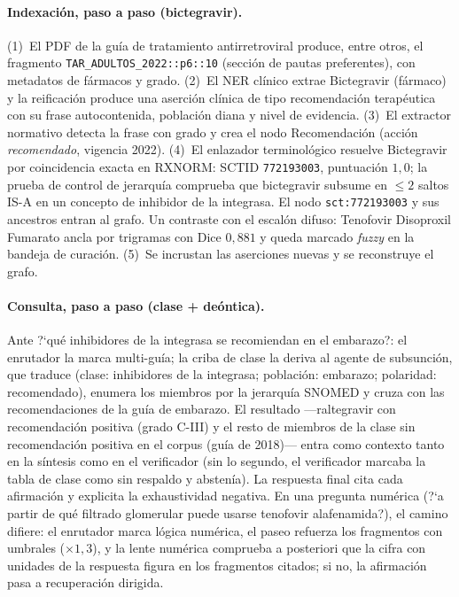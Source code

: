 \documentclass[11pt,a4paper]{article}
\begin{document}
\paragraph{Indexación, paso a paso (bictegravir).}
(1)~El PDF de la guía de tratamiento antirretroviral produce, entre otros,
el fragmento \texttt{TAR\_ADULTOS\_2022::p6::10} (sección de pautas
preferentes), con metadatos de fármacos y grado.
(2)~El NER clínico extrae \guillemotleft{}Bictegravir\guillemotright{} (fármaco) y la reificación
produce una aserción clínica de tipo recomendación terapéutica con su
frase autocontenida, población diana y nivel de evidencia.
(3)~El extractor normativo detecta la frase con grado y crea el nodo
Recomendación (acción \emph{recomendado}, vigencia 2022).
(4)~El enlazador terminológico resuelve \guillemotleft{}Bictegravir\guillemotright{} por coincidencia
exacta en RXNORM: SCTID \texttt{772193003}, puntuación $1{,}0$; la prueba
de control de jerarquía comprueba que bictegravir subsume en $\le 2$ saltos
IS-A en un concepto de \guillemotleft{}inhibidor de la integrasa\guillemotright{}. El nodo
\texttt{sct:772193003} y sus ancestros entran al grafo. Un contraste con el
escalón difuso: \guillemotleft{}Tenofovir Disoproxil Fumarato\guillemotright{} ancla por trigramas con
Dice $0{,}881$ y queda marcado \emph{fuzzy} en la bandeja de curación.
(5)~Se incrustan las aserciones nuevas y se reconstruye el grafo.

\paragraph{Consulta, paso a paso (clase + deóntica).}
Ante \guillemotleft{}?`qué inhibidores de la integrasa se recomiendan en el
embarazo?\guillemotright{}: el enrutador la marca multi-guía; la criba de clase la deriva
al agente de subsunción, que traduce (clase: inhibidores de la integrasa;
población: embarazo; polaridad: recomendado), enumera los miembros por la
jerarquía SNOMED y cruza con las recomendaciones de la guía de embarazo.
El resultado ---raltegravir con recomendación positiva (grado C-III) y el
resto de miembros de la clase sin recomendación positiva en el corpus
(guía de 2018)--- entra como contexto tanto en la síntesis como en el
verificador (sin lo segundo, el verificador marcaba la tabla de clase como
sin respaldo y abstenía). La respuesta final cita cada afirmación y
explicita la exhaustividad negativa. En una pregunta numérica
(\guillemotleft{}?`a partir de qué filtrado glomerular puede usarse tenofovir
alafenamida?\guillemotright{}), el camino difiere: el enrutador marca lógica numérica, el
paseo refuerza los fragmentos con umbrales ($\times 1{,}3$), y la lente
numérica comprueba a posteriori que la cifra con unidades de la respuesta
figura en los fragmentos citados; si no, la afirmación pasa a recuperación
dirigida.
\end{document}
